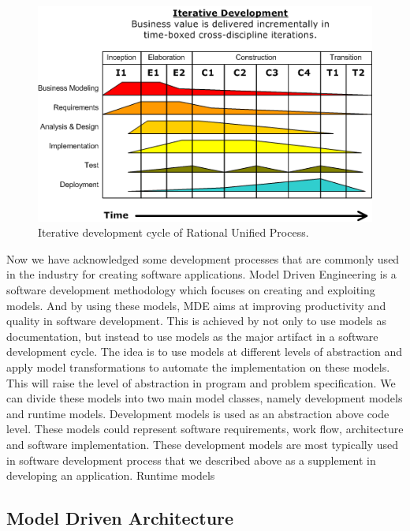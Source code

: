 \begin{figure}[H]
	\centering
	\includegraphics[scale=0.7]{./Figures/RUP.png}
	\caption[Rational Unified Process]
	{Iterative development cycle of Rational Unified Process.}
	\label{fig:RUP}
\end{figure}

Now we have acknowledged some development processes that are commonly used in
the industry for creating software applications. Model Driven Engineering is a
software development methodology which focuses on creating and exploiting
models. And by using these models,  MDE aims at improving productivity and
quality in software development. This is achieved by not only to use models as
documentation, but instead to use models as the major artifact in a software
development cycle. The idea is to use models at different levels of abstraction
and apply model transformations to automate the implementation on these
models.
This will raise the level of abstraction in program and problem specification.
We can divide these models into two main model classes, namely development
models and runtime models\cite{France2007}. Development models is used as an
abstraction above code level. These models could represent software
requirements, work flow, architecture and software implementation. These
development models are most typically used in software development process that
we described above as a supplement in developing an application. Runtime models

\subsection{Model Driven Architecture}

